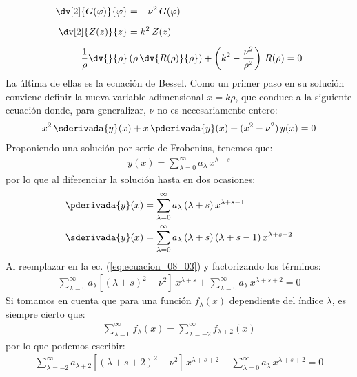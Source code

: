 \begin{align}
\begin{aligned}
\dv[2]{G(\varphi)}{\varphi} &= - \nu^{2} \, G(\varphi) \\[0.5em]
\dv[2]{Z(z)}{z} &= k^{2} \, Z(z) \\[0.5em]
\dfrac{1}{\rho} \dv{}{\rho} &\left( \rho \, \dv{R(\rho)}{\rho} \right) + \left( k^{2} - \dfrac{\nu^{2}}{\rho^{2}} \right) \, R(\rho) = 0
\end{aligned}
\label{eq:ecuacion_08_02} 
\end{align}
La última de ellas es la ecuación de Bessel. Como un primer paso en su solución conviene definir la nueva variable adimensional $ x = k \rho$, que conduce a la siguiente ecuación donde, para generalizar, $\nu$ no es necesariamente entero:
\begin{align}
x^{2} \, \sderivada{y} (x) +  x \, \pderivada{y} (x) +  (x^{2} - \nu^{2}) \, y(x) = 0
\label{eq:ecuacion_08_03}
\end{align}
Proponiendo una solución por serie de Frobenius, tenemos que:
\begin{align*}
y(x) = \sum_{\lambda=0}^{\infty} a_{\lambda} \, x^{\lambda + s}
\end{align*}
por lo que al diferenciar la solución hasta en dos ocasiones:
\begin{align*}
\pderivada{y}(x) &= \sum_{\lambda=0}^{\infty} a_{\lambda} \, (\lambda + s) \, x^{\lambda + s - 1} \\
\sderivada{y}(x) &= \sum_{\lambda=0}^{\infty} a_{\lambda} \, (\lambda + s) \, (\lambda + s - 1) \, x^{\lambda + s - 2}
\end{align*}
Al reemplazar en la ec. (\ref{eq:ecuacion_08_03}) y factorizando los términos:
\begin{align*}
\sum_{\lambda=0}^{\infty} a_{\lambda} \left[ (\lambda + s)^{2} - \nu^{2} \right] \, x^{\lambda + s} + \sum_{\lambda=0}^{\infty} a_{\lambda} \, x^{\lambda + s + 2} = 0
\end{align*}
Si tomamos en cuenta que para una función $f_{\lambda} (x)$ dependiente del índice $\lambda$, es siempre cierto que:
\begin{align*}
\sum_{\lambda=0}^{\infty} f_{\lambda} (x) = \sum_{\lambda=-2}^{\infty} f_{\lambda+2} (x)
\end{align*}
por lo que podemos escribir:
\begin{align*}
\sum_{\lambda=-2}^{\infty} a_{\lambda+2} \left[ (\lambda + s + 2)^{2} - \nu^{2} \right] \, x^{\lambda + s + 2} + \sum_{\lambda=0}^{\infty} a_{\lambda} \, x^{\lambda + s + 2} = 0
\end{align*}
